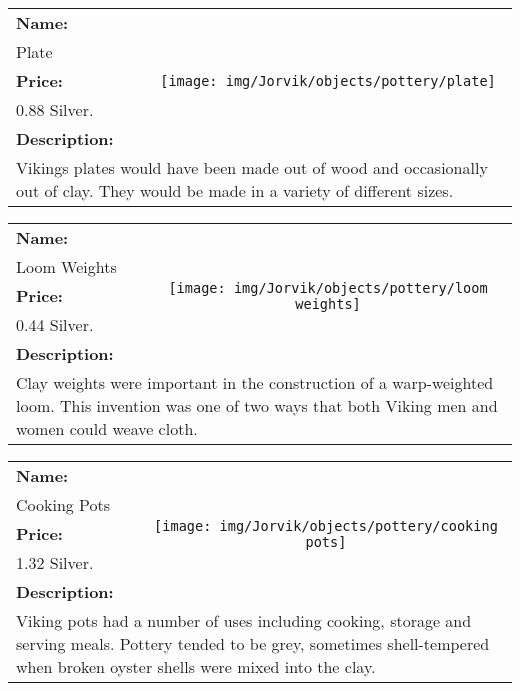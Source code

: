 \begin{table}[ht!]
	\centering
	\begin{tabular}{ p{3cm} c }\toprule
		\textbf{Name:} & \multirow{5}{*}{\texttt{[image: img/Jorvik/objects/pottery/plate]}}\\
		Plate & \\ 
		\textbf{Price:} & \\
		0.88 Silver. & \\ 
		\textbf{Description:} & \\
		\multicolumn{2}{p{12cm}}{Vikings plates would have been made out of wood and occasionally out of clay. They would be made in a variety of different sizes.}\\
		\bottomrule
	\end{tabular}
\end{table}

\begin{table}[ht!]
	\centering
	\begin{tabular}{ p{3cm} c }\toprule
		\textbf{Name:} & \multirow{5}{*}{\texttt{[image: img/Jorvik/objects/pottery/loom weights]}}\\
		Loom Weights & \\ 
		\textbf{Price:} & \\
		0.44 Silver. & \\ 
		\textbf{Description:} & \\
		\multicolumn{2}{p{12cm}}{Clay weights were important in the construction of a warp-weighted loom. This invention was one of two ways that both Viking men and women could weave cloth.}\\
		\bottomrule
	\end{tabular}
\end{table}

\begin{table}[ht!]
	\centering
	\begin{tabular}{ p{3cm} c }\toprule
		\textbf{Name:} & \multirow{5}{*}{\texttt{[image: img/Jorvik/objects/pottery/cooking pots]}}\\
		Cooking Pots & \\ 
		\textbf{Price:} & \\
		1.32 Silver. & \\ 
		\textbf{Description:} & \\
		\multicolumn{2}{p{12cm}}{Viking pots had a number of uses including cooking, storage and serving meals. Pottery tended to be grey, sometimes shell-tempered when broken oyster shells were mixed into the clay.}\\
		\bottomrule
	\end{tabular}
\end{table}

